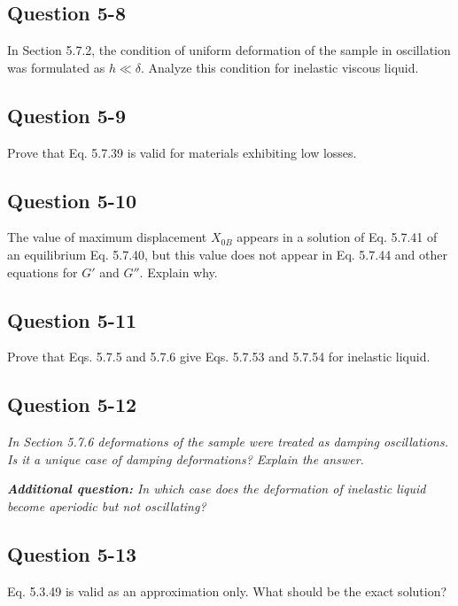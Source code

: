 \subsection*{Question 5-8}
In Section 5.7.2, the condition of uniform deformation of the sample in oscillation was formulated as $h \ll \delta$. Analyze this condition for inelastic viscous liquid.

\subsection*{Question 5-9}
Prove that Eq. 5.7.39 is valid for materials exhibiting low losses.

\subsection*{Question 5-10}
The value of maximum displacement $X_{0B}$ appears in a solution of Eq. 5.7.41 of an equilibrium Eq. 5.7.40, but this value does not appear in Eq. 5.7.44 and other equations for $G'$ and $G''$. Explain why.

\subsection*{Question 5-11}
Prove that Eqs. 5.7.5 and 5.7.6 give Eqs. 5.7.53 and 5.7.54 for inelastic liquid.

\subsection*{Question 5-12}
\textit{In Section 5.7.6 deformations of the sample were treated as damping oscillations. Is it a unique case of damping deformations? Explain the answer.}

\textit{\textbf{Additional question:} In which case does the deformation of inelastic liquid become aperiodic but not oscillating?}

\subsection*{Question 5-13}
Eq. 5.3.49 is valid as an approximation only. What should be the exact solution?



